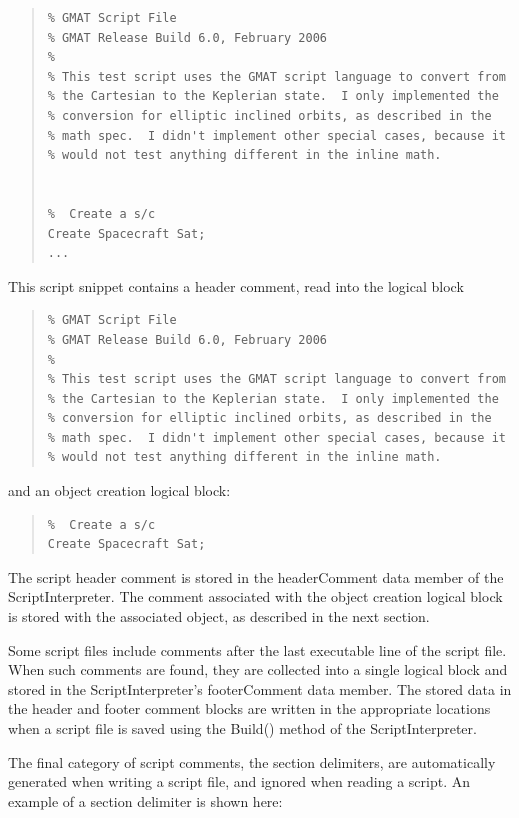 \begin{quote}
\begin{verbatim}
% GMAT Script File
% GMAT Release Build 6.0, February 2006
%
% This test script uses the GMAT script language to convert from
% the Cartesian to the Keplerian state.  I only implemented the
% conversion for elliptic inclined orbits, as described in the
% math spec.  I didn't implement other special cases, because it
% would not test anything different in the inline math.


%  Create a s/c
Create Spacecraft Sat;
...
\end{verbatim}
\end{quote}

\noindent This script snippet contains a header comment, read into the logical block

\begin{quote}
\begin{verbatim}
% GMAT Script File
% GMAT Release Build 6.0, February 2006
%
% This test script uses the GMAT script language to convert from
% the Cartesian to the Keplerian state.  I only implemented the
% conversion for elliptic inclined orbits, as described in the
% math spec.  I didn't implement other special cases, because it
% would not test anything different in the inline math.
\end{verbatim}
\end{quote}

\noindent and an object creation logical block:

\begin{quote}
\begin{verbatim}
%  Create a s/c
Create Spacecraft Sat;
\end{verbatim}
\end{quote}

The script header comment is stored in the headerComment data member of the ScriptInterpreter.  The
comment associated with the object creation logical block is stored with the associated object, as
described in the next section.

Some script files include comments after the last executable line of the script file.  When such
comments are found, they are collected into a single logical block and stored in the
ScriptInterpreter's footerComment data member.  The stored data in the header and footer comment
blocks are written in the appropriate locations when a script file is saved using the Build() method
of the ScriptInterpreter.

The final category of script comments, the section delimiters, are automatically generated when
writing a script file, and ignored when reading a script.  An example of a section delimiter is
shown here:

